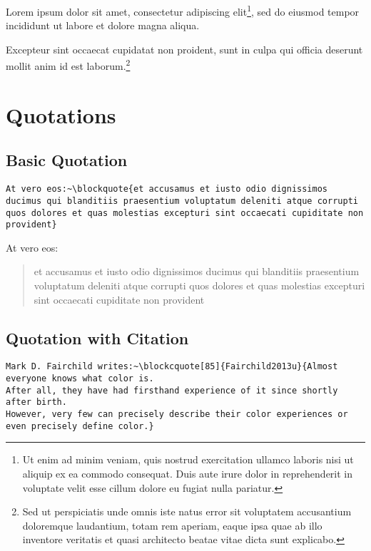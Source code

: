 Lorem ipsum dolor sit amet, consectetur adipiscing elit\footnote{Ut enim ad minim veniam, quis nostrud exercitation ullamco laboris nisi ut aliquip ex ea commodo consequat.
Duis aute irure dolor in reprehenderit in voluptate velit esse cillum dolore eu fugiat nulla pariatur.}, sed do eiusmod tempor incididunt ut labore et dolore magna aliqua.

\begin{center}
Excepteur sint occaecat cupidatat non proident, sunt in culpa qui officia deserunt mollit anim id est laborum.\footnote{Sed ut perspiciatis unde omnis iste natus error sit voluptatem accusantium doloremque laudantium, totam rem aperiam, eaque ipsa quae ab illo inventore veritatis et quasi architecto beatae vitae dicta sunt explicabo.}
\end{center}

\section*{Quotations}%
\label{sec:quotations}

\subsection*{Basic Quotation}%
\label{subsec:basic-quotation}

\begin{lstlisting}[caption={Basic quotation.}]
At vero eos:~\blockquote{et accusamus et iusto odio dignissimos ducimus qui blanditiis praesentium voluptatum deleniti atque corrupti quos dolores et quas molestias excepturi sint occaecati cupiditate non provident}
\end{lstlisting}

At vero eos:~\blockquote{et accusamus et iusto odio dignissimos ducimus qui blanditiis praesentium voluptatum deleniti atque corrupti quos dolores et quas molestias excepturi sint occaecati cupiditate non provident}

\subsection*{Quotation with Citation}%
\label{subsec:quotation-with-citation}

\begin{lstlisting}[caption={Quotation with Citation.}]
Mark D. Fairchild writes:~\blockcquote[85]{Fairchild2013u}{Almost everyone knows what color is.
After all, they have had firsthand experience of it since shortly after birth.
However, very few can precisely describe their color experiences or even precisely define color.}
\end{lstlisting}

